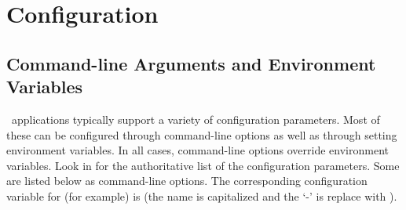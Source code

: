 \section{Configuration}


\subsection{Command-line Arguments and Environment Variables}
\label{subsect:config}
\ensemble\ applications typically support a variety of configuration
parameters.  Most of these can be configured through command-line options as
well as through setting environment variables.  In all cases, command-line
options override environment variables.  Look in  for the
authoritative list of the configuration parameters.  Some are listed below as
command-line options.  The corresponding configuration variable for
 (for example) is  (the name is
capitalized and the `-' is replace with ).

